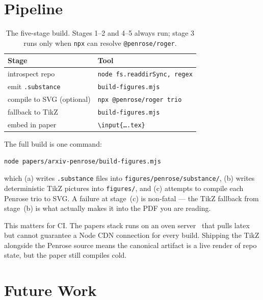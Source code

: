 \documentclass[10pt,letterpaper,twocolumn]{article}
\begin{document}

\section{Pipeline}

\begin{table}[h]
\small
\centering
\begin{tabular}{ll}
\toprule
\textbf{Stage} & \textbf{Tool} \\
\midrule
introspect repo                     & \texttt{node fs.readdirSync, regex} \\
emit \texttt{.substance}            & \texttt{build-figures.mjs}          \\
compile to SVG (optional)           & \texttt{npx @penrose/roger trio}    \\
fallback to TikZ                    & \texttt{build-figures.mjs}          \\
embed in paper                      & \texttt{\textbackslash input\{\ldots.tex\}} \\
\bottomrule
\end{tabular}
\caption{The five-stage build. Stages 1--2 and 4--5 always run; stage 3 runs only when \texttt{npx} can resolve \texttt{@penrose/roger}.}
\end{table}

The full build is one command:

\begin{lstlisting}[language=bash]
node papers/arxiv-penrose/build-figures.mjs
\end{lstlisting}

\noindent which (a) writes \texttt{.substance} files into \texttt{figures/penrose/substance/}, (b) writes deterministic TikZ pictures into \texttt{figures/}, and (c) attempts to compile each Penrose trio to SVG. A failure at stage~(c) is non-fatal --- the TikZ fallback from stage~(b) is what actually makes it into the PDF you are reading.

This matters for CI. The papers stack runs on an oven server~\citep{scudder2026score} that pulls latex but cannot guarantee a Node CDN connection for every build. Shipping the TikZ alongside the Penrose source means the canonical artifact is a live render of repo state, but the paper still compiles cold.


\section{Future Work}
\end{document}
